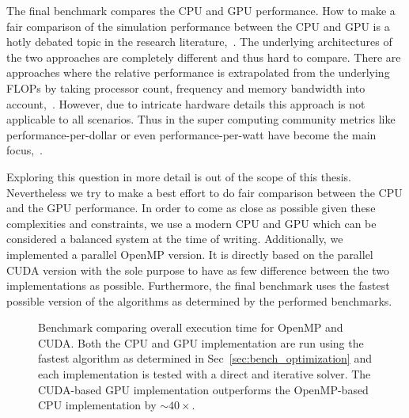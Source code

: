 The final benchmark compares the CPU and GPU performance. How to make a fair comparison of the simulation performance between the CPU and GPU is a hotly debated topic in the research literature,~\cite{Gregg2011}\cite{Lee2010}. The underlying architectures of the two approaches are completely different and thus hard to compare. There are approaches where the relative performance is extrapolated from the underlying FLOPs by taking processor count, frequency and memory bandwidth into account,~\cite{Lee2010}. However, due to intricate hardware details this approach is not applicable to all scenarios. Thus in the super computing community metrics like performance-per-dollar or even performance-per-watt have become the main focus,~\cite{Kamil2008}.

Exploring this question in more detail is out of the scope of this thesis. Nevertheless we try to make a best effort to do fair comparison between the CPU and the GPU performance. In order to come as close as possible given these complexities and constraints, we use a modern CPU and GPU which can be considered a balanced system at the time of writing. Additionally, we implemented a parallel OpenMP version. It is directly based on the parallel CUDA version with the sole purpose to have as few difference between the two implementations as possible. Furthermore, the final benchmark uses the fastest possible version of the algorithms as determined by the performed benchmarks.

\begin{figure}[htbp]
  \centering
  \caption[Benchmark overall execution time.]{Benchmark comparing overall execution time for OpenMP and CUDA. Both the CPU and GPU implementation are run using the fastest algorithm as determined in Sec~\ref{sec:bench_optimization} and each implementation is tested with a direct and iterative solver. The CUDA-based GPU implementation outperforms the OpenMP-based CPU implementation by ${\sim}40×$.}
  \label{fig:overall}
\end{figure}

